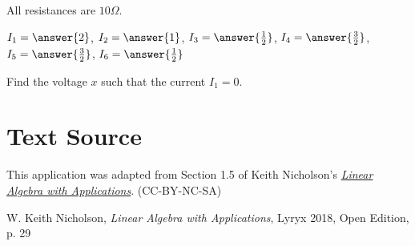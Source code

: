 \documentclass{ximera}
\begin{document}
\begin{problem}
All resistances are $10 \Omega$.

%

$ I_1 = \answer{2}$, $I_2 = \answer{1}$, $I_3 = \answer{\frac{1}{2}}$, $I_4 = \answer{\frac{3}{2}}$, $I_5 = \answer{\frac{3}{2}}$, $I_6 = \answer{\frac{1}{2}}$

\end{problem}

\begin{problem}

Find the voltage $x$ such that the current $I_1 = 0$.

%
\end{problem}

\section*{Text Source} This application was adapted from Section 1.5 of Keith Nicholson's \href{https://open.umn.edu/opentextbooks/textbooks/linear-algebra-with-applications}{\it Linear Algebra with Applications}. (CC-BY-NC-SA)

W. Keith Nicholson, {\it Linear Algebra with Applications}, Lyryx 2018, Open Edition, p. 29 
\end{document}
